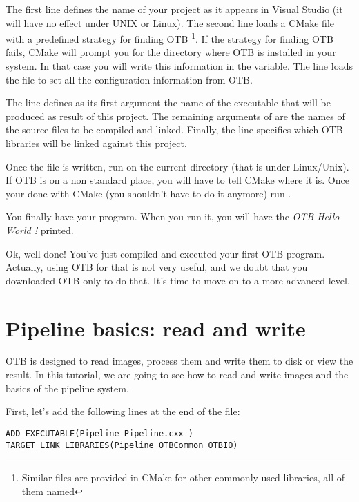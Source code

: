 The first line defines the name of your project as it appears in Visual Studio
(it will have no effect under UNIX or Linux). The second line loads a CMake file
with a predefined strategy for finding OTB \footnote{Similar files are provided
in CMake for other commonly used libraries, all of them named
}. If the strategy for finding OTB fails, CMake will prompt
you for the directory where OTB is installed in your system. In that case you
will write this information in the  variable. The line  loads the  file to set all the
configuration information from OTB.

The line  defines as its first argument the name of the
executable that will be produced as result of this project. The remaining
arguments of  are the names of the source files to be
compiled and linked.  Finally, the  line specifies
which OTB libraries will be linked against this project.



Once the file is written, run  on the current directory
(that is  under Linux/Unix). If OTB is
on a non standard place, you will have to tell CMake where it is. Once your
done with CMake (you shouldn't have to do it anymore) run .

You finally have your program. When you run it, you will have the {\em OTB Hello
World !} printed.

Ok, well done! You've just compiled and executed your first OTB program. Actually,
using OTB for that is not very useful, and we doubt that you downloaded OTB only
to do that. It's time to move on to a more advanced level.


\section{Pipeline basics: read and write}
\label{sec:TutorialPipeline}


OTB is designed to read images, process them and write them to disk or
view the result. In this tutorial, we are going to see how to read and
write images and the basics of the pipeline system.

First, let's add the following lines at the end of the 
file:

\begin{small}
\begin{verbatim}
ADD_EXECUTABLE(Pipeline Pipeline.cxx )
TARGET_LINK_LIBRARIES(Pipeline OTBCommon OTBIO)
\end{verbatim}
\end{small}


